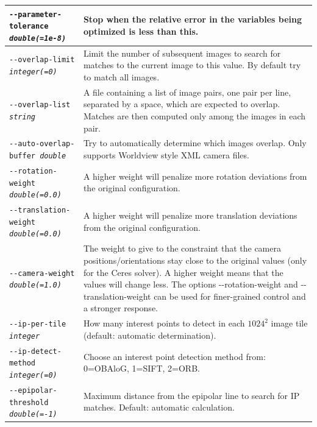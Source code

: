 \begin{longtable}{|p{8cm}|p{9cm}|}
\texttt{-\/-parameter-tolerance \textit{double(=1e-8)}} & Stop when the relative error in the variables being optimized is less than this. \\ \hline

\texttt{-\/-overlap-limit \textit{integer(=0)}} & Limit the number of
subsequent images to search for matches to the current image to this
value.  By default try to match all images.\\ \hline

\texttt{-\/-overlap-list \textit{string}} & A file containing a list of image pairs, one pair per line, separated by a space, which are expected to overlap. Matches are then computed only among the images in each pair.
\\ \hline

\texttt{-\/-auto-overlap-buffer \textit{double}} &
Try to automatically determine which images overlap.  Only supports Worldview style XML camera files.
\\ \hline

\texttt{-\/-rotation-weight \textit{double(=0.0)}} &
A higher weight will penalize more rotation deviations from the original configuration.
\\ \hline

\texttt{-\/-translation-weight \textit{double(=0.0)}} &
A higher weight will penalize more translation deviations from the original configuration.
\\ \hline

\texttt{-\/-camera-weight \textit{double(=1.0)}} &
The weight to give to the constraint that the camera positions/orientations stay close to
the original values (only for the Ceres solver).  A higher weight means that the values will
change less.  The options -\/-rotation-weight and -\/-translation-weight can be used for finer-grained control and a stronger response.
\\ \hline

\texttt{-\/-ip-per-tile \textit{integer}} &
How many interest points to detect in each $1024^2$ image tile (default: automatic
determination).
\\ \hline

\texttt{-\/-ip-detect-method \textit{integer(=0)}} & Choose an interest point
detection method from: 0=OBAloG, 1=SIFT, 2=ORB. \\ \hline

\texttt{-\/-epipolar-threshold \textit{double(=-1)}} & 
Maximum distance from the epipolar line to search for IP matches. Default: automatic calculation.
\\ \hline


\end{longtable}
